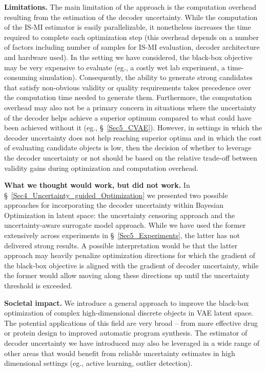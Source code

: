 \textbf{Limitations. } The main limitation of the approach is the computation overhead resulting from the estimation of the decoder uncertainty. While the computation of the IS-MI estimator is easily parallelizable, it nonetheless increases the time required to complete each optimization step (this overhead depends on a number of factors including number of samples for IS-MI evaluation, decoder architecture and hardware used). 
In the setting we have considered, the black-box objective may be very expensive to evaluate (eg., a costly wet lab experiment, a time-consuming simulation). Consequently, the ability to generate strong candidates that satisfy non-obvious validity or quality requirements takes precedence over the computation time needed to generate them. 
Furthermore, the computation overhead may also not be a primary concern in situations where the uncertainty of the decoder helps achieve a superior optimum compared to what could have been achieved without it (eg., \S~\ref{Sec5_CVAE}). 
However, in settings in which the decoder uncertainty does not help reaching superior optima and in which the cost of evaluating candidate objects is low, then the decision of whether to leverage the decoder uncertainty or not should be based on the relative trade-off between validity gains during optimization and computation overhead.

\textbf{What we thought would work, but did not work. } In \S~\ref{Sec4_Uncertainty_guided_Optimization} we presented two possible approaches for incorporating the decoder uncertainty within Bayesian Optimization in latent space: the uncertainty censoring approach and the uncertainty-aware surrogate model approach. While we have used the former extensively across experiments in \S~\ref{Sec5_Experiments}, the latter has not delivered strong results. A possible interpretation would be that the latter approach may heavily penalize optimization directions for which the gradient of the black-box objective is aligned with the gradient of decoder uncertainty, while the former would allow moving along these directions up until the uncertainty threshold is exceeded.

\textbf{Societal impact. } We introduce a general approach to improve the black-box optimization of complex high-dimensional discrete objects in VAE latent space. The potential applications of this field are very broad -- from more effective drug or protein design to improved automatic program synthesis. The estimator of decoder uncertainty we have introduced may also be leveraged in a wide range of other areas that would benefit from reliable uncertainty estimates in high dimensional settings (eg., active learning, outlier detection).


